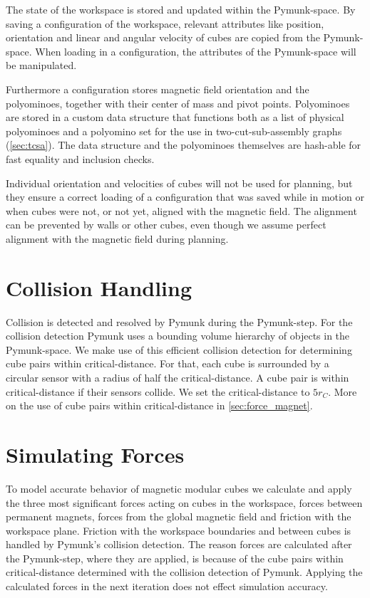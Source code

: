 The state of the workspace is stored and updated within the Pymunk-space.
By saving a configuration of the workspace, relevant attributes like position, orientation and linear and angular velocity of cubes are copied from the Pymunk-space.
When loading in a configuration, the attributes of the Pymunk-space will be manipulated.

Furthermore a configuration stores magnetic field orientation and the polyominoes, together with their center of mass and pivot points.
Polyominoes are stored in a custom data structure that functions both as a list of physical polyominoes and a polyomino set for the use in two-cut-sub-assembly graphs (\autoref{sec:tcsa}).
The data structure and the polyominoes themselves are hash-able for fast equality and inclusion checks.

Individual orientation and velocities of cubes will not be used for planning, but they ensure a correct loading of a configuration that was saved while in motion or when cubes were not, or not yet, aligned with the magnetic field.
The alignment can be prevented by walls or other cubes, even though we assume perfect alignment with the magnetic field during planning.


\section{Collision Handling}
\label{sec:coll_handling}

Collision is detected and resolved by Pymunk during the Pymunk-step.
For the collision detection Pymunk uses a bounding volume hierarchy of objects in the Pymunk-space.
We make use of this efficient collision detection for determining cube pairs within critical-distance.
For that, each cube is surrounded by a circular sensor with a radius of half the critical-distance.
A cube pair is within critical-distance if their sensors collide.
We set the critical-distance to $5 r_C$.
More on the use of cube pairs within critical-distance in \autoref{sec:force_magnet}.

\section{Simulating Forces}

To model accurate behavior of magnetic modular cubes we calculate and apply the three most significant forces acting on cubes in the workspace, forces between permanent magnets, forces from the global magnetic field and friction with the workspace plane.
Friction with the workspace boundaries and between cubes is handled by Pymunk's collision detection.
The reason forces are calculated after the Pymunk-step, where they are applied, is because of the cube pairs within critical-distance determined with the collision detection of Pymunk.
Applying the calculated forces in the next iteration does not effect simulation accuracy.

